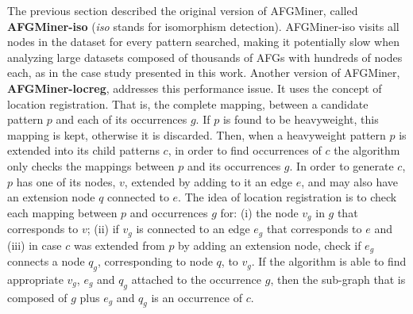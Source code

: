The previous section described the original version of AFGMiner, called {\bf AFGMiner-iso} (\emph{iso} stands for isomorphism detection). AFGMiner-iso visits all nodes in the dataset for every pattern searched, making it potentially slow when analyzing large datasets composed of thousands of AFGs with hundreds of nodes each, as in the case study presented in this work. Another version of AFGMiner, {\bf AFGMiner-locreg}, addresses this performance issue. It uses the concept of location registration. That is, the complete mapping, between a candidate pattern $p$ and each of its occurrences $g$. If $p$ is found to be heavyweight, this mapping is kept, otherwise it is discarded. Then, when a heavyweight pattern $p$ is extended into its child patterns $c$, in order to find occurrences of $c$ the algorithm only checks the mappings between $p$ and its occurrences $g$. In order to generate $c$, $p$ has one of its nodes, $v$, extended by adding to it an edge $e$, and may also have an extension node $q$ connected to $e$. The idea of location registration is to check each mapping between $p$ and occurrences $g$ for: (i) the node $v_g$ in $g$ that corresponds to $v$; (ii) if $v_g$ is connected to an edge $e_g$ that corresponds to $e$ and (iii) in case $c$ was extended from $p$ by adding an extension node, check if $e_g$ connects a node $q_g$, corresponding to node $q$, to $v_g$. If the algorithm is able to find appropriate $v_g$, $e_g$ and $q_g$ attached to the occurrence $g$, then the sub-graph that is composed of $g$ plus $e_g$ and $q_g$ is an occurrence of $c$.






